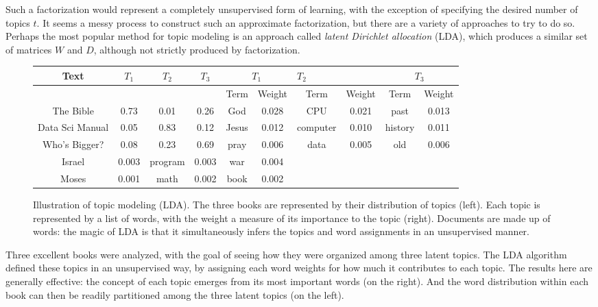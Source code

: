 \documentclass[10pt]{article}
\begin{document}
\begin{enumerate}
Such a factorization would represent a completely unsupervised form of learning, with the exception of specifying the desired number of topics $t$. It seems a messy process to construct such an approximate factorization, but there are a variety of approaches to try to do so. Perhaps the most popular method for topic modeling is an approach called \textit{latent Dirichlet allocation} (LDA), which produces a similar set of matrices $W$ and $D$, although not strictly produced by factorization.

\begin{figure}[h]
\centering
\begin{tabular}{|c|c|c|c|c|c|c|c|c|c|}
\hline
\multirow[b]{2}{*}{Text} & \multirow[b]{2}{*}{$T_{1}$} & \multirow[b]{2}{*}{$T_{2}$} & \multirow[b]{2}{*}{$T_{3}$} & \multicolumn{2}{|c|}{$T_{1}$} & \multicolumn{2}{|l|}{$T_{2}$} & \multicolumn{2}{|c|}{$T_{3}$} \\
\hline
 &  &  &  & Term & Weight & Term & Weight & Term & Weight \\
\hline
The Bible & 0.73 & 0.01 & 0.26 & God & 0.028 & CPU & 0.021 & past & 0.013 \\
\hline
Data Sci Manual & 0.05 & 0.83 & 0.12 & Jesus & 0.012 & computer & 0.010 & history & 0.011 \\
\hline
Who's Bigger? & 0.08 & 0.23 & 0.69 & pray & 0.006 & data & 0.005 & old & 0.006 \\
\hline
Israel & 0.003 & program & 0.003 & war & 0.004 \\
\hline
Moses & 0.001 & math & 0.002 & book & 0.002 \\
\hline
\end{tabular}
\caption{Illustration of topic modeling (LDA). The three books are represented by their distribution of topics (left). Each topic is represented by a list of words, with the weight a measure of its importance to the topic (right). Documents are made up of words: the magic of LDA is that it simultaneously infers the topics and word assignments in an unsupervised manner.}
\label{fig:topicmodeling}
\end{figure}

Three excellent books were analyzed, with the goal of seeing how they were organized among three latent topics. The LDA algorithm defined these topics in an unsupervised way, by assigning each word weights for how much it contributes to each topic. The results here are generally effective: the concept of each topic emerges from its most important words (on the right). And the word distribution within each book can then be readily partitioned among the three latent topics (on the left).


\end{enumerate}
\end{document}
